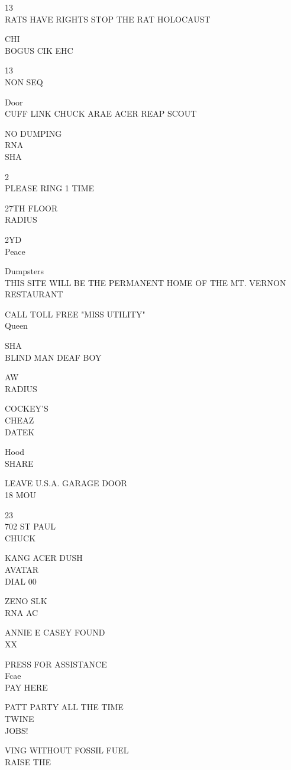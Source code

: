 \documentclass[10pt,letterpaper]{article}
\begin{document}
13\\
RATS HAVE RIGHTS STOP THE RAT HOLOCAUST

CHI\\
BOGUS CIK EHC

13\\
NON SEQ

Door\\
CUFF LINK CHUCK ARAE ACER REAP SCOUT

NO DUMPING\\
RNA\\
SHA

2\\
PLEASE RING 1 TIME

27TH FLOOR\\
RADIUS

2YD\\
Peace

Dumpsters\\
THIS SITE WILL BE THE PERMANENT HOME OF THE MT. VERNON RESTAURANT

CALL TOLL FREE "MISS UTILITY"\\
Queen

SHA\\
BLIND MAN DEAF BOY

AW\\
RADIUS

COCKEY'S\\
CHEAZ\\
DATEK

Hood\\
SHARE

LEAVE U.S.A. GARAGE DOOR\\
18 MOU

23\\
702 ST PAUL\\
CHUCK

KANG ACER DUSH\\
AVATAR\\
DIAL 00

ZENO SLK\\
RNA AC

ANNIE E CASEY FOUND\\
XX

PRESS FOR ASSISTANCE\\
Fcae\\
PAY HERE

PATT PARTY ALL THE TIME\\
TWINE\\
JOBS!

VING WITHOUT FOSSIL FUEL\\
RAISE THE
\end{document}
